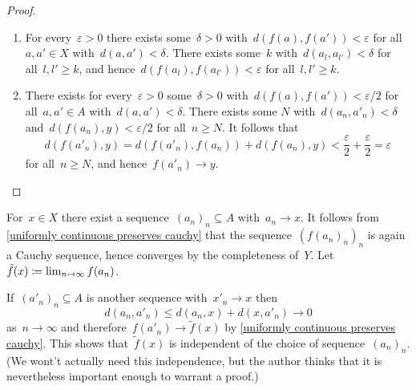 \begin{proof}
  \leavevmode
  \begin{enumerate}
    \item
      For every~$\varepsilon > 0$ there exists some~$\delta > 0$ with~$d(f(a),f(a')) < \varepsilon$ for all~$a, a' \in X$ with~$d(a, a') < \delta$.
      There exists some~$k$ with~$d(a_l, a_{l'}) < \delta$ for all~$l, l' \geq k$, and hence~$d(f(a_l), f(a_{l'})) < \varepsilon$ for all~$l, l' \geq k$.
    \item
      There exists for every~$\varepsilon > 0$ some~$\delta > 0$ with~$d(f(a),f(a')) < \varepsilon/2$ for all~$a, a' \in A$ with~$d(a,a') < \delta$.
      There exists some $N$ with~$d(a_n, a'_n) < \delta$ and~$d(f(a_n), y) < \varepsilon/2$ for all~$n \geq N$.
      It follows that
      \[
          d(f(a'_n), y)
        = d(f(a'_n), f(a_n)) + d(f(a_n), y)
        < \frac{\varepsilon}{2} + \frac{\varepsilon}{2}
        = \varepsilon
      \]
      for all~$n \geq N$, and hence~$f(a'_n) \to y$.
    \qedhere
  \end{enumerate}
\end{proof}

For~$x \in X$ there exist a sequence~$(a_n)_n \subseteq A$ with~$a_n \to x$.
It follows from \cref{uniformly continuous preserves cauchy} that the sequence~$(f(a_n)_n)_n$ is again a Cauchy sequence, hence converges by the completeness of~$Y$.
Let~$\tilde{f}(x) \coloneqq \lim_{n \to \infty} f(a_n)$.

If~$(a'_n)_n \subseteq A$ is another sequence with~$x'_n \to x$ then
\[
        d(a_n, a'_n)
  \leq  d(a_n, x) + d(x, a'_n)
  \to   0
\]
as~$n \to \infty$ and therefore~$f(a'_n) \to \tilde{f}(x)$ by \cref{uniformly continuous preserves cauchy}.
This shows that~$\tilde{f}(x)$ is independent of the choice of sequence~$(a_n)_n$.
(We wont’t actually need this independence, but the author thinks that it is nevertheless important enough to warrant a proof.)

